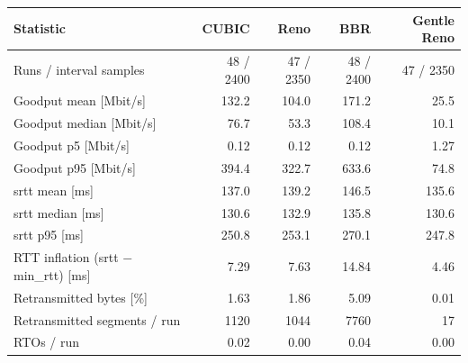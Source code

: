 \begin{tabular}{lrrrr}
\toprule
Statistic & \textbf{CUBIC} & \textbf{Reno} & \textbf{BBR} & \textbf{Gentle Reno} \\
\midrule
Runs / interval samples & 48 / 2400 & 47 / 2350 & 48 / 2400 & 47 / 2350 \\
Goodput mean [Mbit/s] & 132.2 & 104.0 & 171.2 & 25.5 \\
Goodput median [Mbit/s] & 76.7 & 53.3 & 108.4 & 10.1 \\
Goodput p5 [Mbit/s] & 0.12 & 0.12 & 0.12 & 1.27 \\
Goodput p95 [Mbit/s] & 394.4 & 322.7 & 633.6 & 74.8 \\
srtt mean [ms] & 137.0 & 139.2 & 146.5 & 135.6 \\
srtt median [ms] & 130.6 & 132.9 & 135.8 & 130.6 \\
srtt p95 [ms] & 250.8 & 253.1 & 270.1 & 247.8 \\
RTT inflation (srtt $-$ min\_rtt) [ms] & 7.29 & 7.63 & 14.84 & 4.46 \\
Retransmitted bytes [\%] & 1.63 & 1.86 & 5.09 & 0.01 \\
Retransmitted segments / run & 1120 & 1044 & 7760 & 17 \\
RTOs / run & 0.02 & 0.00 & 0.04 & 0.00 \\
\bottomrule
\end{tabular}

